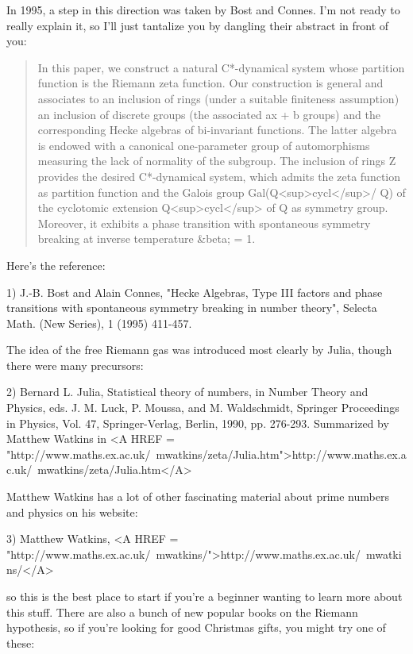 In 1995, a step in this direction was taken by Bost and Connes.  I'm
not ready to really explain it, so I'll just tantalize you by dangling
their abstract in front of you:

\begin{quote}
    In this paper, we construct a natural C*-dynamical system whose 
    partition function is the Riemann zeta function.  Our construction 
    is general and associates to an inclusion of rings (under a 
    suitable finiteness assumption) an inclusion of discrete groups 
    (the associated ax + b groups) and the corresponding Hecke algebras 
    of bi-invariant functions.  The latter algebra is endowed with a
    canonical one-parameter group of automorphisms measuring the lack 
    of normality of the subgroup.  The inclusion of rings Z provides 
    the desired C*-dynamical system, which admits the zeta function 
    as partition function and the Galois group Gal(Q<sup>cycl</sup>/ Q) of 
    the cyclotomic extension Q<sup>cycl</sup> of Q as symmetry group.  Moreover, 
    it exhibits a phase transition with spontaneous symmetry breaking at 
    inverse temperature &beta; = 1.
\end{quote}
    

Here's the reference:

1) J.-B. Bost and Alain Connes, "Hecke Algebras, Type III factors and phase 
transitions with spontaneous symmetry breaking in number theory", Selecta 
Math. (New Series), 1 (1995) 411-457. 

The idea of the free Riemann gas was introduced most clearly by Julia, 
though there were many precursors:

2) Bernard L. Julia, Statistical theory of numbers, in Number Theory
and Physics, eds.  J. M. Luck, P. Moussa, and M. Waldschmidt, Springer
Proceedings in Physics, Vol. 47, Springer-Verlag, Berlin, 1990,
pp. 276-293.  Summarized by Matthew Watkins in
<A HREF = "http://www.maths.ex.ac.uk/~mwatkins/zeta/Julia.htm">http://www.maths.ex.ac.uk/~mwatkins/zeta/Julia.htm</A>

Matthew Watkins has a lot of other fascinating material about prime numbers
and physics on his website:

3) Matthew Watkins, <A HREF = "http://www.maths.ex.ac.uk/~mwatkins/">http://www.maths.ex.ac.uk/~mwatkins/</A>

so this is the best place to start if you're a beginner wanting to
learn more about this stuff.  There are also a bunch of new popular
books on the Riemann hypothesis, so if you're looking for good
Christmas gifts, you might try one of these:


